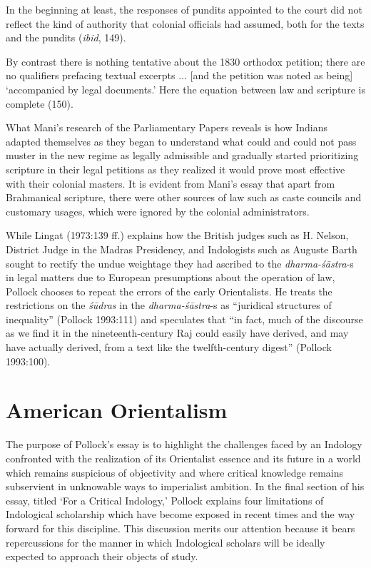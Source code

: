 \begin{myquote}
In the beginning at least, the responses of pundits appointed to the court did not reflect the kind of authority that colonial officials had assumed, both for the texts and the pundits ({\sl ibid}, 149). 

By contrast there is nothing tentative about the 1830 orthodox petition; there are no qualifiers prefacing textual excerpts $\ldots$ [and the petition was noted as being] ‘accompanied by legal documents.’ Here the equation between law and scripture is complete (150). 
\end{myquote}

What Mani’s research of the Parliamentary Papers reveals is how Indians adapted themselves as they began to understand what could and could not pass muster in the new regime as legally admissible and gradually started prioritizing scripture in their legal petitions as they realized it would prove most effective with their colonial masters. It is evident from Mani’s essay that apart from Brahmanical scripture, there were other sources of law such as caste councils and customary usages, which were ignored by the colonial administrators.
\newpage

While Lingat (1973:139 ff.) explains how the British judges such as H. Nelson, District Judge in the Madras Presidency, and Indologists such as Auguste Barth sought to rectify the undue weightage they had ascribed to the {\sl dharma-śāstra}-s in legal matters due to European presumptions about the operation of law, Pollock chooses to repeat the errors of the early Orientalists. He treats the restrictions on the {\sl śūdras} in the {\sl dharma-śāstra}-s as “juridical structures of inequality” (Pollock 1993:111) and speculates that “in fact, much of the discourse as we find it in the nineteenth-century Raj could easily have derived, and may have actually derived, from a text like the twelfth-century digest” (Pollock 1993:100).
\medskip

\section*{American Orientalism}

The purpose of Pollock’s essay is to highlight the challenges faced by an Indology confronted with the realization of its Orientalist essence and its future in a world which remains suspicious of objectivity and where critical knowledge remains subservient in unknowable ways to imperialist ambition. In the final section of his essay, titled ‘For a Critical Indology,’ Pollock explains four limitations of Indological scholarship which have become exposed in recent times and the way forward for this discipline. This discussion merits our attention because it bears repercussions for the manner in which Indological scholars will be ideally expected to approach their objects of study.
\vskip 2pt


